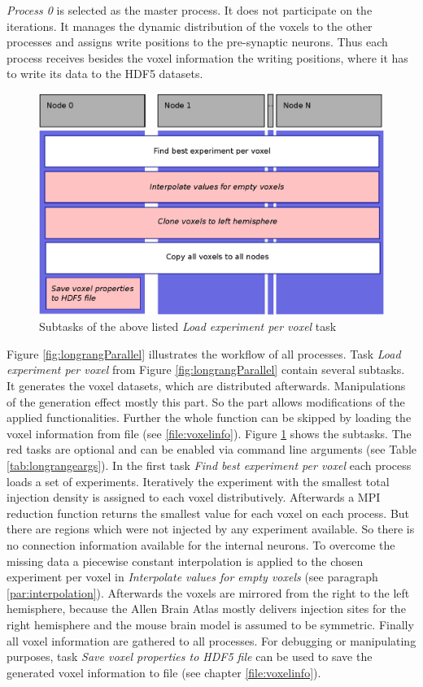 \emph{Process 0} is selected as the master process. It does not participate on the iterations.
It manages the dynamic distribution of the voxels to the other processes and 
assigns write positions to the pre-synaptic neurons. Thus each process receives besides the 
voxel information the writing positions,
where it has to write its data to the HDF5 datasets.
\begin{figure}[ht!]
\centering
\includegraphics[scale=0.5]{pictures/longRange_BestExp_parallelAlg.eps}
\caption{Subtasks of the above listed \emph{Load experiment per voxel} task}
\label{fig:longrangeLEPV}
\end{figure}

Figure \ref{fig:longrangParallel} illustrates the workflow of all processes.
Task \emph{Load experiment per voxel} from Figure \ref{fig:longrangParallel} contain several subtasks.
It generates the voxel datasets, which are distributed afterwards.
Manipulations of the generation effect mostly this part.
So the part allows modifications of the applied functionalities. 
Further the whole function can be skipped by loading the voxel information from file (see \ref{file:voxelinfo}).
Figure \ref{fig:longrangeLEPV} shows the subtasks.
The red tasks are optional and can be enabled via command line arguments (see Table \ref{tab:longrangeargs}).
In the first task \emph{Find best experiment per voxel} each process loads a set of experiments.
Iteratively the experiment with the smallest total injection density is assigned to each voxel
distributively. Afterwards a MPI reduction function returns the smallest value for each voxel on
each process.
But there are regions which were not injected by any experiment available.
So there is no connection information available for the internal neurons.
To overcome the missing data a piecewise constant interpolation is applied to the chosen experiment per voxel
in \emph{Interpolate values for empty voxels} (see paragraph \ref{par:interpolation}).
Afterwards the voxels are mirrored from the right to the left hemisphere, because the
Allen Brain Atlas mostly delivers injection sites for the right hemisphere and
the mouse brain model is assumed to be symmetric.
Finally all voxel information are gathered to all processes.
For debugging or manipulating purposes, task \emph{Save voxel properties to HDF5 file} can be used
to save the generated voxel information to file (see chapter \ref{file:voxelinfo}).

